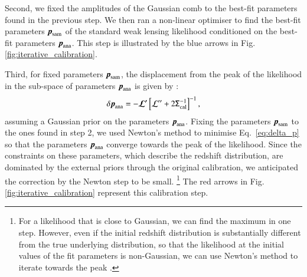 \documentclass{aa}
\newcommand{\eq}[1]{\begin{equation}  #1 \end{equation}}
\begin{document}
Second, we fixed the amplitudes of the Gaussian comb to the best-fit parameters found in the previous step. We then ran a non-linear optimiser to find the best-fit parameters $\boldsymbol{p}_{\rm sam}$ of the standard weak lensing likelihood conditioned on the best-fit parameters $\boldsymbol{p}_{\rm ana}$. This step is illustrated by the blue arrows in Fig. \ref{fig:iterative_calibration}.

Third, for fixed parameters $\boldsymbol{p}_{\rm sam}$, the displacement from the peak of the likelihood in the sub-space of parameters $\boldsymbol{p}_{\rm ana}$ is given by \citep{taylor10}:
\eq{
\label{eq:delta_p}
\delta\boldsymbol{p}_{\rm ana} = -\boldsymbol{\cal L^\prime}\left[{\cal L^{\prime\prime}}+2\tens{\Sigma}_{\rm cal}^{-1}\right]^{-1},
}
assuming a Gaussian prior on the parameters $\boldsymbol{p}_{\rm ana}$. Fixing the parameters $\boldsymbol{p}_{\rm sam}$ to the ones found in step 2, we used Newton's method to minimise Eq.\ \eqref{eq:delta_p} so that the parameters $\boldsymbol{p}_{\rm ana}$ converge towards the peak of the likelihood. Since the constraints on these parameters, which describe the redshift distribution, are dominated by the external priors through the original calibration, we anticipated the correction by the Newton step to be small. \footnote{For a likelihood that is close to Gaussian, we can find the maximum in one step. However, even if the initial redshift distribution is substantially different from the true underlying distribution, so that the likelihood at the initial values of the fit parameters is non-Gaussian, we can use Newton's method to iterate towards the peak \citep{taylor10}.} The red arrows in Fig. \ref{fig:iterative_calibration} represent this calibration step.  
\end{document}
